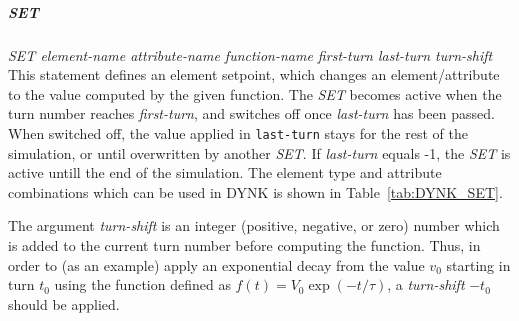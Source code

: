 \documentclass[a4paper,11pt]{report}
\begin{document}
\subparagraph{SET} \emph{SET element-name attribute-name function-name first-turn last-turn turn-shift}\\
This statement defines an element setpoint, which changes an element/attribute to the value computed by the given function.
The \emph{SET} becomes active when the turn number reaches \emph{first-turn}, and switches off once \emph{last-turn} has been passed.
When switched off, the value applied in \texttt{last-turn} stays for the rest of the simulation, or until overwritten by another \emph{SET}.
If \emph{last-turn} equals -1, the \emph{SET} is active untill the end of the simulation.
The element type and attribute combinations which can be used in DYNK is shown in Table~\ref{tab:DYNK_SET}.

The argument \emph{turn-shift} is an integer (positive, negative, or zero) number which is added to the current turn number before computing the function.
Thus, in order to (as an example) apply an exponential decay from the value $v_0$ starting in turn $t_0$ using the function defined as $f(t) = V_0 \exp(-t/\tau)$,
a \emph{turn-shift} $-t_0$ should be applied.
\end{document}
